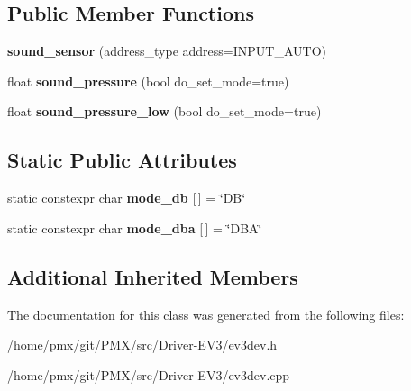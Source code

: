\subsection*{Public Member Functions}
\begin{DoxyCompactItemize}
\item 
\mbox{\label{classev3dev_1_1sound__sensor_a2bd7140601eefd23b6fbe026386bc4a1}} 
{\bfseries sound\+\_\+sensor} (address\+\_\+type address=I\+N\+P\+U\+T\+\_\+\+A\+U\+TO)
\item 
\mbox{\label{classev3dev_1_1sound__sensor_a969c6acaaeb993fc93bd0df2c2693ef7}} 
float {\bfseries sound\+\_\+pressure} (bool do\+\_\+set\+\_\+mode=true)
\item 
\mbox{\label{classev3dev_1_1sound__sensor_ab73c50182c3581b5c23a353348890b65}} 
float {\bfseries sound\+\_\+pressure\+\_\+low} (bool do\+\_\+set\+\_\+mode=true)
\end{DoxyCompactItemize}
\subsection*{Static Public Attributes}
\begin{DoxyCompactItemize}
\item 
\mbox{\label{classev3dev_1_1sound__sensor_acae116e9d4db40cb621bcd854222bfbb}} 
static constexpr char {\bfseries mode\+\_\+db} \mbox{[}$\,$\mbox{]} = \char`\"{}DB\char`\"{}
\item 
\mbox{\label{classev3dev_1_1sound__sensor_a0b9590ca31e3bfb1cd6386fdbb818f9b}} 
static constexpr char {\bfseries mode\+\_\+dba} \mbox{[}$\,$\mbox{]} = \char`\"{}D\+BA\char`\"{}
\end{DoxyCompactItemize}
\subsection*{Additional Inherited Members}


The documentation for this class was generated from the following files\+:\begin{DoxyCompactItemize}
\item 
/home/pmx/git/\+P\+M\+X/src/\+Driver-\/\+E\+V3/ev3dev.\+h\item 
/home/pmx/git/\+P\+M\+X/src/\+Driver-\/\+E\+V3/ev3dev.\+cpp\end{DoxyCompactItemize}
